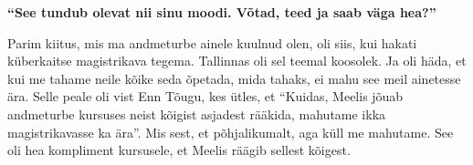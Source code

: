 \textbf{\enquote{See tundub olevat nii sinu moodi. Võtad, teed ja saab väga
hea?}}

Parim kiitus, mis ma andmeturbe ainele kuulnud olen, oli siis, kui hakati
küberkaitse magistrikava tegema. Tallinnas oli sel teemal koosolek. Ja oli
häda, et kui me tahame neile kõike seda õpetada, mida tahaks, ei mahu see meil
ainetesse ära. Selle peale oli vist Enn Tõugu, kes
ütles, et \enquote{Kuidas, Meelis jõuab andmeturbe kursuses neist kõigist
asjadest rääkida, mahutame ikka magistrikavasse ka ära}. Mis sest, et
põhjalikumalt, aga küll me mahutame. See oli hea kompliment kursusele, et
Meelis räägib sellest kõigest.

